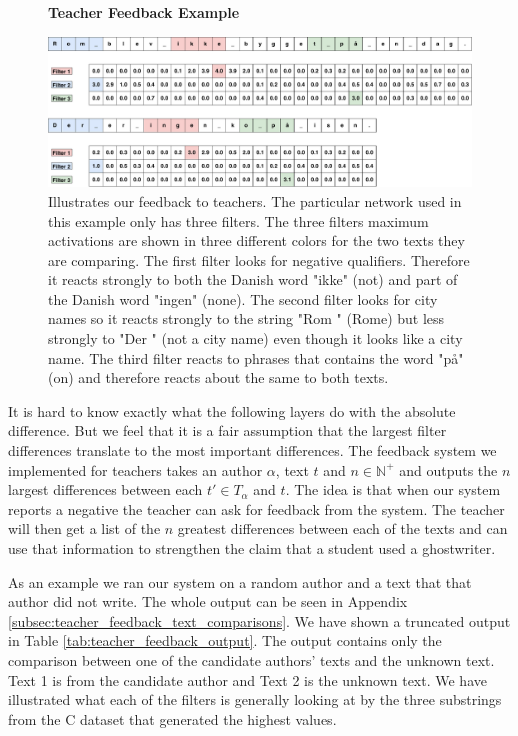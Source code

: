 \begin{figure}
    \centering
    \textbf{Teacher Feedback Example}\par\medskip
    \includegraphics[width=\textwidth]{./pictures/discussion/teacher_feedback_example}
    \caption{Illustrates our feedback to teachers. The particular network
        used in this example only has three filters. The three filters maximum
        activations are shown in three different colors for the two texts they
        are comparing. The first filter looks for negative qualifiers. Therefore
        it reacts strongly to both the Danish word "ikke" (not) and part of the
        Danish word "ingen" (none). The second filter looks for city names so it
        reacts strongly to the string "Rom " (Rome) but less strongly to "Der "
        (not a city name) even though it looks like a city name. The third
        filter reacts to phrases that contains the word "p\aa " (on) and
        therefore reacts about the same to both texts.}
    \label{fig:feature_extraction_output_example}
\end{figure}

It is hard to know exactly what the following layers do with the absolute
difference. But we feel that it is a fair assumption that the largest filter
differences translate to the most important differences. The feedback system
we implemented for teachers takes an author $\alpha$, text $t$ and $n \in
\mathbb{N}^+$ and outputs the $n$ largest differences between each $t' \in
T_\alpha$ and $t$. The idea is that when our system reports a negative the
teacher can ask for feedback from the system. The teacher will then get a list
of the $n$ greatest differences between each of the texts and can use that
information to strengthen the claim that a student used a ghostwriter.

As an example we ran our system on a random author and a text that
that author did not write. The whole output can be seen in Appendix
\ref{subsec:teacher_feedback_text_comparisons}. We have shown a truncated
output in Table \ref{tab:teacher_feedback_output}. The output contains only
the comparison between one of the candidate authors' texts and the unknown
text. Text 1 is from the candidate author and Text 2 is the unknown text. We
have illustrated what each of the filters is generally looking at by the three
substrings from the \gls{C} dataset that generated the highest values.

